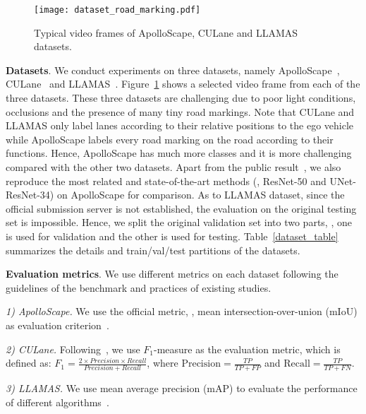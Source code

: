 \documentclass[10pt,twocolumn,letterpaper]{article}
\begin{document}
\begin{figure}[t]
  \centering
  \texttt{[image: dataset\_road\_marking.pdf]}
  \vskip -0.2cm
  \caption{Typical video frames of ApolloScape, CULane and LLAMAS datasets.}
  \centering
  \vskip -0.5cm
  \label{fig:dataset}
\end{figure}

\vspace{0.1cm}
\noindent
\textbf{Datasets}.
We conduct experiments on three datasets, namely ApolloScape~\cite{huang2018apolloscape}, CULane~\cite{pan2017spatial} and LLAMAS~\cite{llamas2019}.
Figure~\ref{fig:dataset} shows a selected video frame from each of the three datasets.
These three datasets are challenging due to poor light conditions, occlusions and the presence of many tiny road markings. 
Note that CULane and LLAMAS only label lanes according to their relative positions to the ego vehicle while ApolloScape labels every road marking on the road according to their functions. Hence, ApolloScape has much more classes and it is more challenging compared with the other two datasets. Apart from the public result~\cite{huang2018apolloscape}, we also reproduce the most related and state-of-the-art methods (\eg, ResNet-50 and UNet-ResNet-34) on ApolloScape for comparison. As to LLAMAS dataset, since the official submission server is not established, the evaluation on the original testing set is impossible. Hence, we split the original validation set into two parts, \ie, one is used for validation and the other is used for testing. Table~\ref{dataset_table} summarizes the details and train/val/test partitions of the datasets.


\noindent
\textbf{Evaluation metrics}. We use different metrics on each dataset following the guidelines of the benchmark and practices of existing studies.

\noindent \textit{1) ApolloScape.} We use the official metric, \ie, mean intersection-over-union (mIoU) as evaluation criterion~\cite{huang2018apolloscape}.

\noindent \textit{2) CULane.} Following~\cite{pan2017spatial}, we use $F_{1}$-measure as the evaluation metric, which is defined as: $F_{1} = \frac{2 \times Precision \times Recall}{Precision + Recall}$,
where $\mathrm{Precision} = \frac{TP}{TP + FP}$ and $\mathrm{Recall} = \frac{TP}{TP + FN}$.

\noindent \textit{3) LLAMAS.} We use mean average precision (mAP) to evaluate the performance of different algorithms~\cite{llamas2019}.
\end{document}
